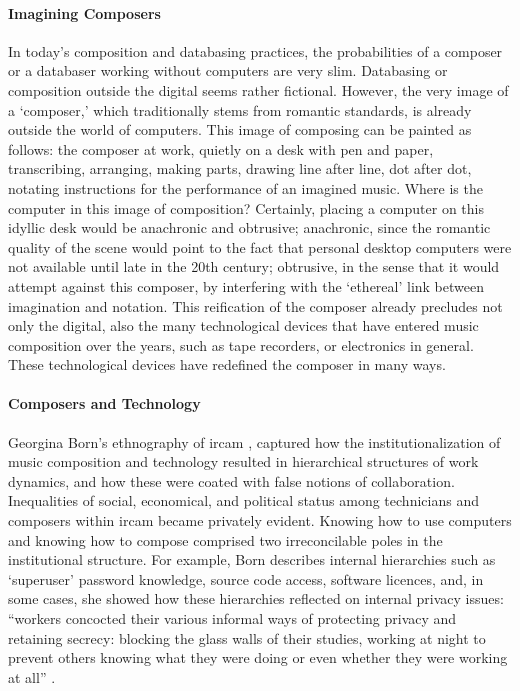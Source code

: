 
\paragraph{Imagining Composers}
In today's composition and databasing practices, the probabilities of a composer or a databaser working without computers are very slim. Databasing or composition outside the digital seems rather fictional. However, the very image of a `composer,' which traditionally stems from romantic standards, is already outside the world of computers. This image of composing can be painted as follows: the composer at work, quietly on a desk with pen and paper, transcribing, arranging, making parts, drawing line after line, dot after dot, notating instructions for the performance of an imagined music. Where is the computer in this image of composition? Certainly, placing a computer on this idyllic desk would be anachronic and obtrusive; anachronic, since the romantic quality of the scene would point to the fact that personal desktop computers were not available until late in the 20th century; obtrusive, in the sense that it would attempt against this composer, by interfering with the `ethereal' link between imagination and notation. This reification of the composer already precludes not only the digital, also the many technological devices that have entered music composition over the years, such as tape recorders, or electronics in general. These technological devices have redefined the composer in many ways. 

\paragraph{Composers and Technology}
Georgina Born's ethnography of \gls{ircam} \parencite{Bor95:Rat}, captured how the institutionalization of music composition and technology resulted in hierarchical structures of work dynamics, and how these were coated with false notions of collaboration. Inequalities of social, economical, and political status among technicians and composers within \gls{ircam} became privately evident. Knowing how to use computers and knowing how to compose comprised two irreconcilable poles in the institutional structure. For example, Born describes internal hierarchies such as `superuser' password knowledge, source code access, software licences, and, in some cases, she showed how these hierarchies reflected on internal privacy issues: ``workers concocted their various informal ways of protecting privacy and retaining secrecy: blocking the glass walls of their studies, working at night to prevent others knowing what they were doing or even whether they were working at all'' \parencite[272]{Bor95:Rat}. 


